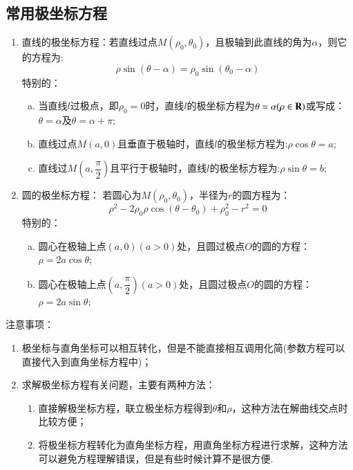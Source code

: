 \documentclass{BHCexam}
\begin{document}
\subsection{常用极坐标方程}
\begin{enumerate}[1)]
\item 直线的极坐标方程：若直线过点$ M(\rho_0,\theta_0) $，且极轴到此直线的角为$\alpha$，则它的方程为:$$\rho\sin(\theta-\alpha)=\rho_0\sin(\theta_0-\alpha)$$特别的：
\begin{enumerate}[a)]
\item 当直线$ l $过极点，即$ \rho_0=0 $时，直线$ l $的极坐标方程为$ \theta=\alpha (\rho\in\mathbf{R})$或写成：$\theta=\alpha $及$ \theta=\alpha+\pi $;
\item 直线过点$ M(a,0) $且垂直于极轴时，直线$ l $的极坐标方程为:$\rho\cos \theta=a$;
\item 直线过$ M(a,\dfrac{\pi}{2}) $且平行于极轴时，直线$ l $的极坐标方程为:$ \rho\sin\theta=b $;
\end{enumerate}
\item 圆的极坐标方程： 若圆心为$ M(\rho_0,\theta_0) $，半径为$r$的圆方程为：$$\rho^2-2\rho_0\rho\cos(\theta-\theta_0)+\rho_0^2-r^2=0$$特别的：
\begin{enumerate}[a)]
\item 圆心在极轴上点$ (a,0) (a>0)$处，且圆过极点$ O $的圆的方程：$\rho=2a\cos\theta$;
\item 圆心在极轴上点$ (a,\dfrac{\pi}{2}) (a>0)$处，且圆过极点$ O $的圆的方程：$\rho=2a\sin\theta$;
\end{enumerate}
\end{enumerate}
注意事项：
\begin{enumerate}[1)]
\item 极坐标与直角坐标可以相互转化，但是不能直接相互调用化简(参数方程可以直接代入到直角坐标方程中)；
\item 求解极坐标方程有关问题，主要有两种方法：
\begin{enumerate}[(1)]
\item 直接解极坐标方程，联立极坐标方程得到$ \theta $和$ \rho $，这种方法在解曲线交点时比较方便；
\item 将极坐标方程转化为直角坐标方程，用直角坐标方程进行求解，这种方法可以避免方程理解错误，但是有些时候计算不是很方便.
\end{enumerate}
\end{enumerate}
\end{document}
